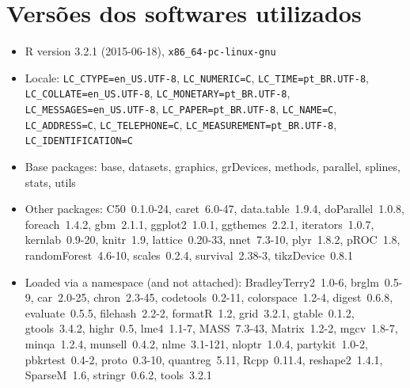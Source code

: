 \documentclass[a4paper,titlepage]{ppgi}\usepackage[]{graphicx}\usepackage[]{color}
\begin{document}
\chapter{Versões dos softwares utilizados}

\begin{itemize}\raggedright
  \item R version 3.2.1 (2015-06-18), \verb|x86_64-pc-linux-gnu|
  \item Locale: \verb|LC_CTYPE=en_US.UTF-8|, \verb|LC_NUMERIC=C|, \verb|LC_TIME=pt_BR.UTF-8|, \verb|LC_COLLATE=en_US.UTF-8|, \verb|LC_MONETARY=pt_BR.UTF-8|, \verb|LC_MESSAGES=en_US.UTF-8|, \verb|LC_PAPER=pt_BR.UTF-8|, \verb|LC_NAME=C|, \verb|LC_ADDRESS=C|, \verb|LC_TELEPHONE=C|, \verb|LC_MEASUREMENT=pt_BR.UTF-8|, \verb|LC_IDENTIFICATION=C|
  \item Base packages: base, datasets, graphics, grDevices,
    methods, parallel, splines, stats, utils
  \item Other packages: C50~0.1.0-24, caret~6.0-47,
    data.table~1.9.4, doParallel~1.0.8, foreach~1.4.2, gbm~2.1.1,
    ggplot2~1.0.1, ggthemes~2.2.1, iterators~1.0.7,
    kernlab~0.9-20, knitr~1.9, lattice~0.20-33, nnet~7.3-10,
    plyr~1.8.2, pROC~1.8, randomForest~4.6-10, scales~0.2.4,
    survival~2.38-3, tikzDevice~0.8.1
  \item Loaded via a namespace (and not attached):
    BradleyTerry2~1.0-6, brglm~0.5-9, car~2.0-25, chron~2.3-45,
    codetools~0.2-11, colorspace~1.2-4, digest~0.6.8,
    evaluate~0.5.5, filehash~2.2-2, formatR~1.2, grid~3.2.1,
    gtable~0.1.2, gtools~3.4.2, highr~0.5, lme4~1.1-7,
    MASS~7.3-43, Matrix~1.2-2, mgcv~1.8-7, minqa~1.2.4,
    munsell~0.4.2, nlme~3.1-121, nloptr~1.0.4, partykit~1.0-2,
    pbkrtest~0.4-2, proto~0.3-10, quantreg~5.11, Rcpp~0.11.4,
    reshape2~1.4.1, SparseM~1.6, stringr~0.6.2, tools~3.2.1
\end{itemize}


%
%
%
\end{document}
